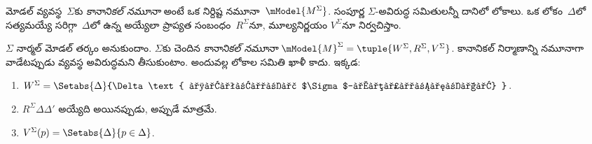 \documentclass[../../../include/open-logic-section]{subfiles}
\begin{document}


మోడల్ వ్యవస్థ~$\Sigma$కు \emph{కానానికల్ నమూనా} అంటే
ఒక నిర్దిష్ట నమూనా~$\mModel{M^\Sigma}$. సంపూర్ణ
$\Sigma$-అవిరుద్ధ సమితులన్నీ దానిలో లోకాలు. ఒక లోకం~$\Delta$లో
సత్యమయ్యే  సరిగ్గా~$\Delta$లో
ఉన్న  అయ్యేలా
ప్రాప్యత సంబంధం~$R^\Sigma$నూ, మూల్యనిర్ణయం $V^\Sigma$నూ నిర్వచిస్తాం.

\begin{defn}
  $\Sigma$ నార్మల్ మోడల్ తర్కం అనుకుందాం. $\Sigma$కు చెందిన
  \emph{కానానికల్ నమూనా} $\mModel{M}^\Sigma = \tuple{W^\Sigma,
    R^\Sigma, V^\Sigma}$.
  కానానికల్ నిర్మాణాన్ని నమూనాగా వాడేటప్పుడు వ్యవస్థ అవిరుద్ధమని తీసుకుంటాం.
  అందువల్ల లోకాల సమితి ఖాళీ కాదు.
  ఇక్కడ:
  \begin{enumerate}
  \item $W^\Sigma = \Setabs{ \Delta }{\Delta \text{
      సంపూర్ణ $\Sigma$-అవిరుద్ధం} }$.
  \item $R^\Sigma \Delta\Delta'$ అయ్యేది
     అయినప్పుడు, అప్పుడే మాత్రమే.
  \item $V^\Sigma(p) = \Setabs{\Delta}{p \in \Delta}$.
  \end{enumerate}
\end{defn}
\end{document}
